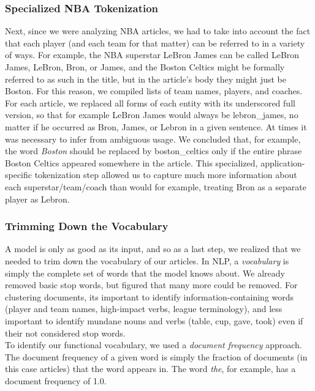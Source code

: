 \documentclass[11pt]{article}
\begin{document}
\subsubsection{Specialized NBA Tokenization}
Next, since we were analyzing NBA articles, we had to take into account the fact that each player (and each team for that matter) can be referred to in a variety of ways. For example, the NBA superstar LeBron James can be called LeBron James, LeBron, Bron, or James, and the Boston Celtics might be formally referred to as such in the title, but in the article's body they might just be Boston. For this reason, we compiled lists of team names, players, and coaches.  For each article, we replaced all forms of each entity with its underscored full version, so that for example LeBron James would always be lebron\_james, no matter if he occurred as Bron, James, or Lebron in a given sentence.  At times it was necessary to infer from ambiguous usage. We concluded that, for example, the word \textit{Boston} should be replaced by boston\_celtics only if the entire phrase Boston Celtics appeared somewhere in the article.  This specialized, application-specific tokenization step allowed us to capture much more information about each superstar/team/coach than would for example, treating Bron as a separate player as Lebron. \\

\subsubsection{Trimming Down the Vocabulary}
A model is only as good as its input, and so as a last step, we realized that we needed to trim down the vocabulary of our articles. In NLP, a \textit{vocabulary} is simply the complete set of words that the model knows about.  We already removed basic stop words, but figured that many more could be removed. For clustering documents, its important to identify information-containing words (player and team names, high-impact verbs, league terminology), and less important to identify mundane nouns and verbs (table, cup, gave, took) even if their not considered stop words. \\

To identify our functional vocabulary, we used a \textit{document frequency} approach. The document frequency of a given word is simply the fraction of documents (in this case articles) that the word appears in. The word \textit{the}, for example, has a document frequency of 1.0. \\
\end{document}

